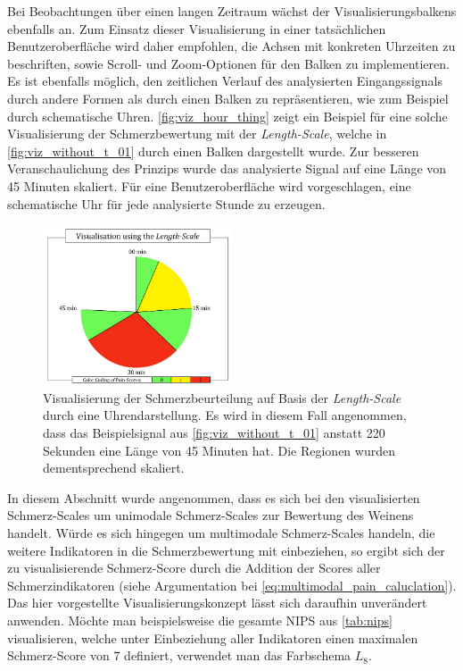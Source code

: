 Bei Beobachtungen über einen langen Zeitraum wächst der Visualisierungsbalkens ebenfalls an. Zum Einsatz dieser Visualisierung in einer tatsächlichen Benutzeroberfläche wird daher empfohlen, die Achsen mit konkreten Uhrzeiten zu beschriften, sowie Scroll- und Zoom-Optionen für den Balken zu implementieren. Es ist ebenfalls möglich, den zeitlichen Verlauf des analysierten Eingangssignals durch andere Formen als durch einen Balken zu repräsentieren, wie zum Beispiel durch schematische Uhren. \autoref{fig:viz_hour_thing} zeigt ein Beispiel für eine solche Visualisierung der Schmerzbewertung mit der \emph{Length-Scale}, welche in \autoref{fig:viz_without_t_01} durch einen Balken dargestellt wurde. Zur besseren Veranschaulichung des Prinzips wurde das analysierte Signal auf eine Länge von 45 Minuten skaliert. Für eine Benutzeroberfläche wird vorgeschlagen, eine schematische Uhr für jede analysierte Stunde zu erzeugen.

\begin{figure}[h]
	\centering
	\includegraphics[width=0.5\textwidth]{bilder/visualisation_hour_02.png}
	\caption[Visualisierung der Schmerzbeurteilung durch eine schematische Uhr]{Visualisierung der Schmerzbeurteilung auf Basis der \emph{Length-Scale} durch eine Uhrendarstellung. Es wird in diesem Fall angenommen, dass das Beispielsignal aus \autoref{fig:viz_without_t_01} anstatt 220 Sekunden eine Länge von 45 Minuten hat. Die Regionen wurden dementsprechend skaliert.}
	\label{fig:viz_hour_thing}
\end{figure}

In diesem Abschnitt wurde angenommen, dass es sich bei den visualisierten Schmerz-Scales um unimodale Schmerz-Scales zur Bewertung des Weinens handelt. Würde es sich hingegen um multimodale Schmerz-Scales handeln, die weitere Indikatoren in die Schmerzbewertung mit einbeziehen, so ergibt sich der zu visualisierende Schmerz-Score durch die Addition der Scores aller Schmerzindikatoren (siehe Argumentation bei  \autoref{eq:multimodal_pain_caluclation}). Das hier vorgestellte Visualisierungskonzept lässt sich daraufhin unverändert anwenden. Möchte man beispielsweise die gesamte NIPS aus \autoref{tab:nips} visualisieren, welche unter Einbeziehung aller Indikatoren einen maximalen Schmerz-Score von 7 definiert, verwendet man das Farbschema $L_8$.

